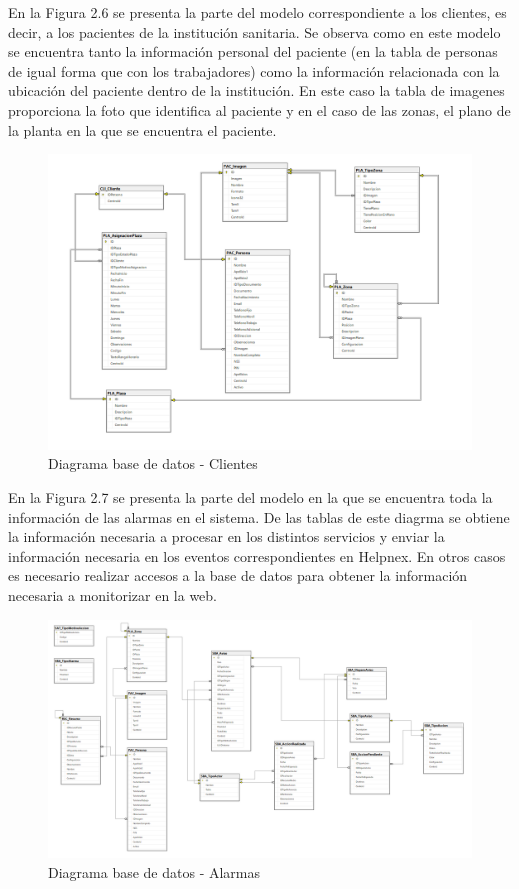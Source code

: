 \newpage
En la Figura 2.6 se presenta la parte del modelo correspondiente a los clientes, es decir, a los pacientes de la institución sanitaria. Se observa como en este modelo se encuentra tanto la información personal del paciente (en la tabla de personas de igual forma que con los trabajadores) como la información relacionada con la ubicación del paciente dentro de la institución. En este caso la tabla de imagenes proporciona la foto que identifica al paciente y en el caso de las zonas, el plano de la planta en la que se encuentra el paciente.

\begin{figure}[H]
    \centering
    \includegraphics[width=16cm]{Imagenes/Diagrama-BD-Clientes}
    \caption{Diagrama base de datos - Clientes}
    \label{fig:Diagrama-BD-Clientes}
\end{figure}

\newpage
En la Figura 2.7 se presenta la parte del modelo en la que se encuentra toda la información de las alarmas en el sistema. De las tablas de este diagrma se obtiene la información necesaria a procesar en los distintos servicios y enviar la información necesaria en los eventos correspondientes en Helpnex. En otros casos es necesario realizar accesos a la base de datos para obtener la información necesaria a monitorizar en la web.

\begin{figure}[H]
    \centering
    \includegraphics[width=16cm]{Imagenes/Diagrama-BD-Alertas}
    \caption{Diagrama base de datos - Alarmas}
    \label{fig:Diagrama-BD-}
\end{figure}

